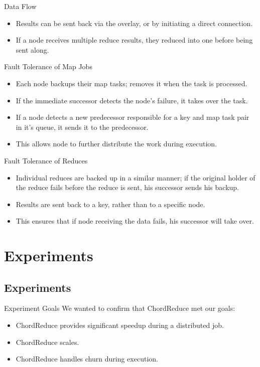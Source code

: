 \documentclass[11pt]{beamer}
\begin{document}
\begin{frame}{Data Flow}
\begin{itemize}
	\item Results can be sent back via the overlay, or by initiating a direct connection.
	\item If a node receives multiple reduce results, they reduced into one before being sent along.
\end{itemize}
 
\end{frame}


\begin{frame}{Fault Tolerance of Map Jobs}
\begin{itemize}
	\item Each node backups their map tasks; removes it when the task is processed.
	\item If the immediate successor detects the node's failure, it takes over the task.
	\item If a node detects a new predecessor responsible for a key and map task pair in it's queue, it sends it to the predecessor.
	\item This allows node to further distribute the work during execution.
\end{itemize}
\end{frame}



\begin{frame}{Fault Tolerance of Reduces}
\begin{itemize}
	\item Individual reduces are backed up in a similar manner; if the original holder of the reduce fails before the reduce is sent, his successor sends his backup.
	\item Results are sent back to a key, rather than to a specific node.
	\item This ensures that if node receiving the data fails, his successor will take over.
\end{itemize}
\end{frame}



\section{Experiments}

\subsection{Experiments}
\begin{frame}{Experiment Goals}
We wanted to confirm that ChordReduce met our goals:

\begin{itemize}
    \item ChordReduce provides significant speedup during a distributed job.
    \item ChordReduce scales.
    \item ChordReduce handles churn during execution.
\end{itemize}

\end{frame}
\end{document}
